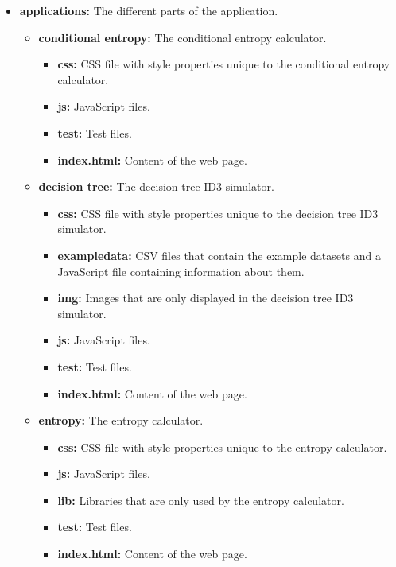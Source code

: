 \begin{itemize}
    \item \textbf{applications:} The different parts of the application.
    \begin{itemize}
        \item \textbf{conditional entropy:} The conditional entropy calculator.
        \begin{itemize}
            \item \textbf{css:} CSS file with style properties unique to the conditional entropy calculator.
            \item \textbf{js:} JavaScript files.
            \item \textbf{test:} Test files.
            \item \textbf{index.html:} Content of the web page.
        \end{itemize}
        \item \textbf{decision tree:} The decision tree ID3 simulator.
        \begin{itemize}
            \item \textbf{css:} CSS file with style properties unique to the decision tree ID3 simulator.
            \item \textbf{exampledata:} CSV files that contain the example datasets and a JavaScript file containing information about them.
            \item \textbf{img:} Images that are only displayed in the decision tree ID3 simulator.
            \item \textbf{js:} JavaScript files.
            \item \textbf{test:} Test files.
            \item \textbf{index.html:} Content of the web page.
        \end{itemize}
        \item \textbf{entropy:} The entropy calculator.
        \begin{itemize}
            \item \textbf{css:} CSS file with style properties unique to the entropy calculator.
            \item \textbf{js:} JavaScript files.
            \item \textbf{lib:} Libraries that are only used by the entropy calculator.
            \item \textbf{test:} Test files.
            \item \textbf{index.html:} Content of the web page.
        \end{itemize}

\end{itemize}
\end{itemize}
